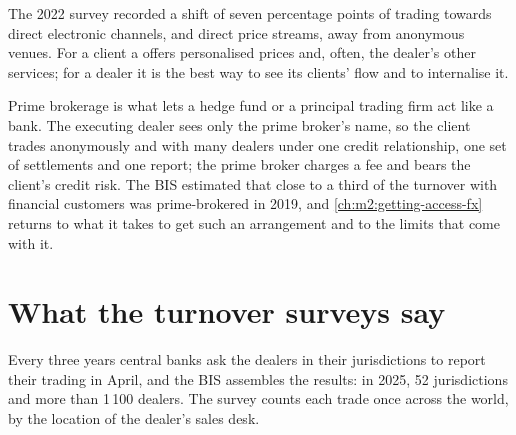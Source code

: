 The 2022 survey recorded a shift of seven percentage points of trading towards
direct electronic channels,  and direct price streams,
away from anonymous venues. For a client a  offers
personalised prices and, often, the dealer's other services; for a dealer it is
the best way to see its clients' flow and to internalise it.

Prime brokerage is what lets a hedge fund or a principal trading firm act like a
bank. The executing dealer sees only the prime broker's name, so the client
trades anonymously and with many dealers under one credit relationship, one set
of settlements and one report; the prime broker charges a fee and bears the
client's credit risk. The BIS estimated that close to a third of the turnover
with financial customers was prime-brokered in 2019, and \cref{ch:m2:getting-access-fx}
returns to what it takes to get such an arrangement and to the limits that come
with it.

\section{What the turnover surveys say}

Every three years central banks ask the dealers in their jurisdictions to
report their trading in April, and the BIS assembles the results: in 2025, 52
jurisdictions and more than 1\,100 dealers. The survey counts each trade once
across the world, by the location of the dealer's sales desk.

\begin{omfigure}

\label{fig:m2:the-fx-market:instruments}
\end{omfigure}

